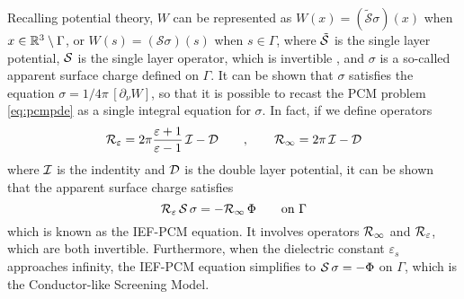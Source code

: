 Recalling potential theory, $W$ can be represented as $W(x) = (\tilde{\mathcal{S}}\sigma)(x)$ when $x \in \mathbb{R}^3 \setminus \Gamma$, or $W(s) = (\mathcal{S}\sigma)(s)$ when $s \in \Gamma$, where $\tilde{\mathcal{S}}$ is the single layer potential, $\mathcal{S}$ is the single layer operator,  which is invertible \cite{Calderon}, and $\sigma$ is a so-called apparent surface charge defined on $\Gamma$.
It can be shown that $\sigma$ satisfies the equation $\sigma = 1/4\pi \, [ \partial_\nu W]$, so that it is possible to recast the PCM problem \eqref{eq:pcmpde} as a single integral equation for $\sigma$. In fact, if we define operators 
\begin{equation}
 \label{eq:Reps}
 \mathcal{R}_\varepsilon = 2\pi \frac{\varepsilon+1}{\varepsilon-1} \, \mathcal{I} - \mathcal{D} \qquad, \qquad \mathcal{R}_\infty = 2\pi \, \mathcal{I} - \mathcal{D}
\end{equation}
where $\mathcal{I}$ is the indentity and $\mathcal{D}$ is the double layer potential, it can be shown that the apparent surface charge satisfies
\begin{equation}
\label{eq:IEFPCM}
\mathcal{R}_\varepsilon \, \mathcal{S} \, \sigma = - \mathcal{R}_\infty \, \Phi \qquad \text{on }\Gamma
\end{equation}
which is known as the IEF-PCM equation. It involves operators $\mathcal{R}_\infty$ and $\mathcal{R}_\varepsilon$, which are both invertible. Furthermore, when the dielectric constant $\varepsilon_s$ approaches infinity, the IEF-PCM equation simplifies to $\mathcal{S} \, \sigma = - \Phi$ on $\Gamma$, which is the Conductor-like Screening Model\cite{Lipparini_JCP_VPCM}.


